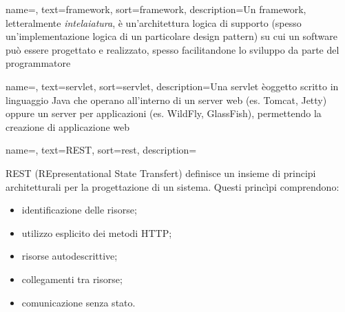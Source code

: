 {name=,
	text=framework,
	sort=framework,
	description={Un framework, letteralmente \emph{intelaiatura}, è un'architettura logica di supporto (spesso un'implementazione logica di un particolare design pattern) su cui un software può essere progettato e realizzato, spesso facilitandone lo sviluppo da parte del programmatore}
}

{name=,
	text=servlet,
	sort=servlet,
	description={Una servlet èoggetto scritto in linguaggio Java che operano all'interno di un server web (es. Tomcat, Jetty) oppure un server per applicazioni (es. WildFly, GlassFish), permettendo la creazione di applicazione web}
}

{name=,
	text=REST,
	sort=rest,
	description={REST (REpresentational State Transfert) definisce un insieme di principi architetturali per la progettazione di un sistema. Questi princìpi comprendono:
	\begin{itemize}
		\item identificazione delle risorse;
		\item utilizzo esplicito dei metodi HTTP;
		\item risorse autodescrittive;
		\item collegamenti tra risorse;
		\item comunicazione senza stato.
	\end{itemize}}
}